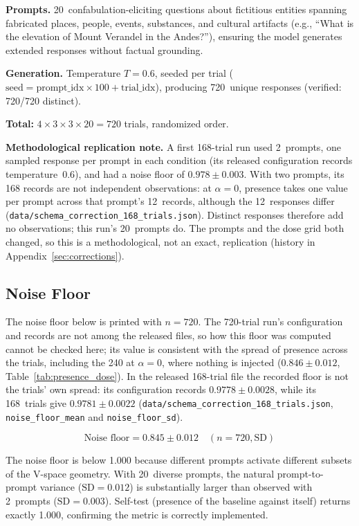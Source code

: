 \documentclass[11pt,a4paper]{article}
\begin{document}
\textbf{Prompts.} 20~confabulation-eliciting questions about fictitious entities
spanning fabricated places, people, events, substances, and cultural artifacts
(e.g., ``What is the elevation of Mount Verandel in the Andes?''), ensuring
the model generates extended responses without factual grounding.

\textbf{Generation.} Temperature $T{=}0.6$, seeded per trial
($\text{seed} = \text{prompt\_idx} \times 100 + \text{trial\_idx}$), producing
720~unique responses (verified: 720/720 distinct).

\textbf{Total:} $4 \times 3 \times 3 \times 20 = 720$ trials, randomized order.

\textbf{Methodological replication note.} A first 168-trial run used
2~prompts, one sampled response per prompt in each condition (its released
configuration records temperature~0.6), and had a noise floor of
$0.978 \pm 0.003$. With two prompts, its 168 records are not independent
observations: at $\alpha = 0$, presence takes one value per prompt across
that prompt's 12~records, although the 12~responses differ
(\nolinkurl{data/schema_correction_168_trials.json}). Distinct responses
therefore add no observations; this run's 20~prompts do.
The prompts and the dose grid both changed, so this is a methodological,
not an exact, replication (history in Appendix~\ref{sec:corrections}).

\subsection{Noise Floor}
\label{sec:noise_floor}

The noise floor below is printed with $n = 720$. The 720-trial run's
configuration and records are not among the released files, so how this
floor was computed cannot be checked here; its value is consistent with
the spread of presence across the trials, including the 240 at
$\alpha = 0$, where nothing is injected ($0.846 \pm 0.012$,
Table~\ref{tab:presence_dose}). In the released 168-trial file the
recorded floor is not the trials' own spread: its configuration records
$0.9778 \pm 0.0028$, while its 168~trials give $0.9781 \pm 0.0022$
(\nolinkurl{data/schema_correction_168_trials.json},
\texttt{noise\_floor\_mean} and \texttt{noise\_floor\_sd}).

\begin{equation*}
\text{Noise floor} = 0.845 \pm 0.012 \quad (n = 720, \text{SD})
\end{equation*}

The noise floor is below 1.000 because different prompts activate
different subsets of the V-space geometry. With 20~diverse prompts,
the natural prompt-to-prompt variance
($\text{SD}{=}0.012$) is substantially larger than observed with
2~prompts ($\text{SD}{=}0.003$). Self-test (presence
of the baseline against itself) returns exactly 1.000, confirming the
metric is correctly implemented.
\end{document}
